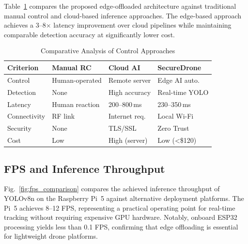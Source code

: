 \documentclass[conference]{IEEEtran}
\begin{document}
Table~\ref{tab:comparison} compares the proposed edge-offloaded architecture against traditional manual control and cloud-based inference approaches. The edge-based approach achieves a 3--8$\times$ latency improvement over cloud pipelines while maintaining comparable detection accuracy at significantly lower cost.

\begin{table}[!t]
\centering
\caption{Comparative Analysis of Control Approaches}
\label{tab:comparison}
\begin{tabular}{p{1.6cm}p{1.7cm}p{1.7cm}p{1.7cm}}
\toprule
\textbf{Criterion} & \textbf{Manual RC} & \textbf{Cloud AI} & \textbf{SecureDrone} \\
\midrule
Control       & Human-operated     & Remote server    & Edge AI auto. \\
Detection     & None               & High accuracy    & Real-time YOLO \\
Latency       & Human reaction     & 200--800\,ms     & 230--350\,ms \\
Connectivity  & RF link            & Internet req.    & Local Wi-Fi \\
Security      & None               & TLS/SSL          & Zero Trust \\
Cost          & Low                & High (server)    & Low (\textless\$120) \\
\bottomrule
\end{tabular}
\end{table}

\subsection{FPS and Inference Throughput}

Fig.~\ref{fig:fps_comparison} compares the achieved inference throughput of YOLOv8n on the Raspberry Pi~5 against alternative deployment platforms. The Pi~5 achieves 8--12 FPS, representing a practical operating point for real-time tracking without requiring expensive GPU hardware. Notably, onboard ESP32 processing yields less than 0.1 FPS, confirming that edge offloading is essential for lightweight drone platforms.
\end{document}

